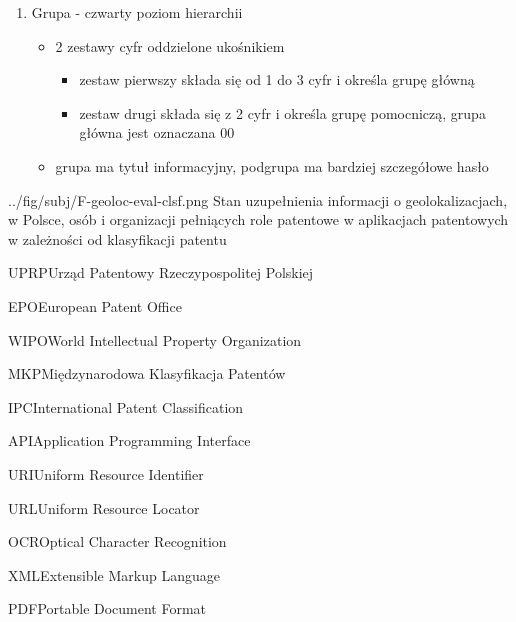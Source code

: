 \begin{enumerate}
\item Grupa - czwarty poziom hierarchii

  \begin{itemize}
\item 2 zestawy cyfr oddzielone ukośnikiem

  \begin{itemize}
\item zestaw pierwszy składa się od 1 do 3 cyfr i określa grupę główną
\item zestaw drugi składa się z 2 cyfr i określa grupę pomocniczą, grupa główna jest oznaczana 00
\end{itemize}

\item grupa ma tytuł informacyjny, podgrupa ma bardziej szczegółowe hasło
\end{itemize}

\end{enumerate}




\figside
{../fig/subj/F-geoloc-eval-clsf.png}
{ Stan uzupełnienia informacji o geolokalizacjach, w Polsce, 
  osób i organizacji pełniących role patentowe
  w aplikacjach patentowych w zależności od klasyfikacji patentu}




  \newpage\begin{acronym}

\acro
{UPRP}{Urząd Patentowy Rzeczypospolitej Polskiej}

\acro
{EPO}{European Patent Office}

\acro
{WIPO}{World Intellectual Property Organization}

\acro
{MKP}{Międzynarodowa Klasyfikacja Patentów}

\acro
{IPC}{International Patent Classification}

\acro
{API}{Application Programming Interface}

\acro
{URI}{Uniform Resource Identifier}

\acro
{URL}{Uniform Resource Locator}

\acro
{OCR}{Optical Character Recognition}

\acro
{XML}{Extensible Markup Language}

\acro
{PDF}{Portable Document Format}

\end{acronym}